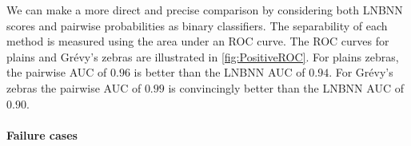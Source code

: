
        We can make a more direct and precise comparison by considering both LNBNN scores and pairwise
          probabilities as binary classifiers.
        The separability of each method is measured using the area under an ROC curve.
        The ROC curves for plains and Grévy's zebras are illustrated in \cref{fig:PositiveROC}.
        For plains zebras, the pairwise AUC of $0.96$ is better than the LNBNN AUC of $0.94$.
        For Grévy's zebras the pairwise AUC of $0.99$ is convincingly better than the LNBNN AUC of $0.90$.

        \PositiveHist{}

        \PositiveROC{}







        \paragraph{Failure cases}

